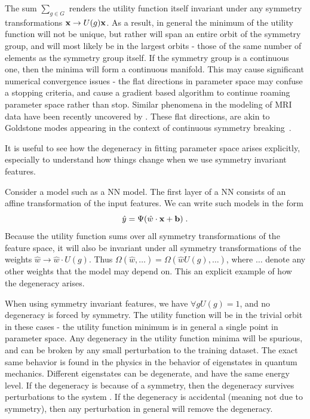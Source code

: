 \documentclass{svproc}
\begin{document}
The sum $\sum_{g \in G}$ renders the utility function itself invariant under any symmetry transformations ${\bf x} \rightarrow U(g) {\bf x}$. As a result, in general the minimum of the utility function will not be unique, but rather will span an entire orbit of the symmetry group, and will most likely be in the largest orbits - those of the same number of elements as the symmetry group itself. If the symmetry group is a continuous one, then the minima will form a continuous manifold. This may cause significant numerical convergence issues - the flat directions in parameter space may confuse a stopping criteria, and cause a gradient based algorithm to continue roaming parameter space rather than stop. Similar phenomena in the modeling of MRI data have been recently uncovered by \cite{novikov2018rotationally}. These flat directions, are akin to Goldstone modes appearing in the context of continuous symmetry breaking~\cite{nambu1960quasi, goldstone1961field, goldstone1962broken}.

It is useful to see how the degeneracy in fitting parameter space arises explicitly, especially to understand how things change when we use symmetry invariant features.

Consider a model such as a NN model. The first layer of a NN consists of an affine transformation of the input features. We can write such models in the form
\begin{equation}
{\hat y} = \Psi( {\hat w} \cdot {\bf x} + {\bf b})
\; .
\end{equation}
Because the utility function sums over all symmetry transformations of the feature space, it will also be invariant under all symmetry transformations of the weights ${\hat w} \rightarrow {\hat w} \cdot U(g)$. Thus $\Omega({\hat w}, \ldots) = \Omega({\hat w} U(g), \ldots)$, where $\ldots$ denote any other weights that the model may depend on. This an explicit example of how the degeneracy arises. 

When using symmetry invariant features, we have $\forall g U(g) = 1$, and no degeneracy is forced by symmetry. The utility function will be in the trivial orbit in these cases - the utility function minimum is in general a single point in parameter space. Any degeneracy in the utility function minima will be spurious, and can be broken by any small perturbation to the training dataset. The exact same behavior is found in the physics in the behavior of eigenstates in quantum mechanics. Different eigenstates can be degenerate, and have the same energy level. If the degeneracy is because of a symmetry, then the degeneracy survives perturbations to the system . If the degeneracy is accidental (meaning not due to symmetry), then any perturbation in general will remove the degeneracy.
\end{document}
